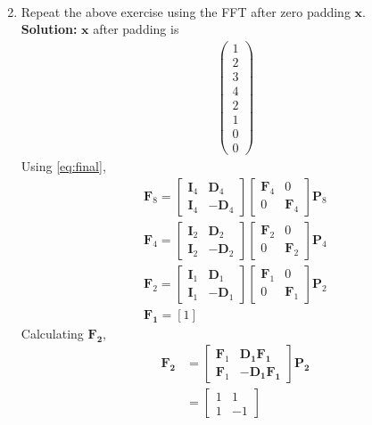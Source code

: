 \documentclass[journal,12pt,twocolumn]{IEEEtran}
\newcommand{\solution}{\noindent \textbf{Solution: }}
\providecommand{\sbrak}[1]{\ensuremath{\left[#1\right]}}
\let\vec\mathbf
\numberwithin{equation}{section}
\renewcommand\thesection{\arabic{section}}
\newcommand{\myvec}[1]{\ensuremath{\begin{pmatrix}#1\end{pmatrix}}}
\begin{document}
\begin{enumerate}[label=\arabic*.,ref=\thesection.\theenumi]
\begin{align}
\end{align}
    \item Repeat the above exercise using the FFT
	    after zero padding $\vec{x}$.\\
\solution $\vec{x}$ after padding is 
\begin{align}
\myvec{1\\2\\3\\4\\2\\1\\0\\0}
\end{align}
Using \eqref{eq:final},
\begin{align}
\vec{F}_{8}=
\begin{bmatrix}
\vec{I}_{4} & \vec{D}_{4} \\
\vec{I}_{4} & -\vec{D}_{4}
\end{bmatrix}
\begin{bmatrix}
\vec{F}_{4} & 0 \\
0 & \vec{F}_{4}
\end{bmatrix}
\vec{P}_{8}\\
\vec{F}_{4}=
\begin{bmatrix}
\vec{I}_{2} & \vec{D}_{2} \\
\vec{I}_{2} & -\vec{D}_{2}
\end{bmatrix}
\begin{bmatrix}
\vec{F}_{2} & 0 \\
0 & \vec{F}_{2}
\end{bmatrix}
\vec{P}_{4}\\
\vec{F}_{2}=
\begin{bmatrix}
\vec{I}_{1} & \vec{D}_{1} \\
\vec{I}_{1} & -\vec{D}_{1}
\end{bmatrix}
\begin{bmatrix}
\vec{F}_{1} & 0 \\
0 & \vec{F}_{1}
\end{bmatrix}
\vec{P}_{2}\\
\vec{F_1}=\sbrak{1}
\end{align}
Calculating $\vec{F_2}$,
\begin{align}
\vec{F_2}&=\begin{bmatrix}
\vec{F}_{1} & \vec{D_1F_1} \\
\vec{F}_{1} & -\vec{D_1F_1}
\end{bmatrix}\vec{P_2}\\
&=\begin{bmatrix}1&1\\1&-1\end{bmatrix}

\end{align}
\end{enumerate}
\end{document}
